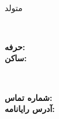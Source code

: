 \documentclass{./../lib/resume}
\begin{document}
\iftoggle{Dev}{\par}{}
\noindent\parbox{56mm}
{\parbox{56mm}{\centering\Huge\bfseries\color{cyan}\fullName}\\\parbox{56mm}{\centering متولد \bornData}}\parbox{2mm}{\ }\parbox{65mm}
{\textbf{حرفه:} \ProfessionI\\\textbf{ساکن:} \fullAddress}\parbox{2mm}{\ }\parbox{65mm}
{\textbf{شماره تماس:} \mobilePhoneI\\\textbf{آدرس رایانامه:} \emailI}

\descriptions

\craft

\workExperience

\teaching

\project

\education

\publication

\LicensesCertifications

\honorsAwards

\training
\end{document}
